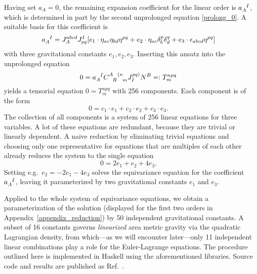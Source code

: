 \begin{example}
  Having set $a_A = 0$, the remaining expansion coefficient for the linear order is $a_A^{\hphantom AI}$, which is determined in part by the second unprolonged equation \eqref{prolong_0}. A suitable basis for this coefficient is
  \begin{equation}
    a_A^{\hphantom AI} = J_A^{abcd} J_{pq}^I\lbrack e_1 \cdot \eta_{ac} \eta_{bd} \eta^{pq} + e_2 \cdot \eta_{ac} \delta_b^p \delta_d^q + e_3 \cdot \epsilon_{abcd} \eta^{pq} \rbrack
  \end{equation}
  with three gravitational constants $e_1,e_2,e_3$. Inserting this ansatz into the unprolonged equation
  \begin{equation}
    0 = a_A^{\hphantom AI} \gmc{A}{B}{(n}{m} J^{pq)}_I N^B =\vcentcolon T^{npq}_m
  \end{equation}
  yields a tensorial equation $0 = T^{npq}_m$ with 256 components. Each component is of the form
  \begin{equation}
    0 = c_1\cdot e_1  + c_2\cdot e_2 + c_3\cdot e_3.
  \end{equation}
  The collection of all components is a system of 256 linear equations for three variables. A lot of these equations are redundant, because they are trivial or linearly dependent. A naive reduction by eliminating trivial equations and choosing only one representative for equations that are multiples of each other already reduces the system to the single equation
  \begin{equation}
    0 = 2 e_1 + e_2 + 4 e_3.
  \end{equation}
  Setting e.g.~$e_2 = -2 e_1 -4 e_3$ solves the equivariance equation for the coefficient $a_A^{\hphantom AI}$, leaving it parameterized by two gravitational constants $e_1$ and $e_3$.
\end{example}

Applied to the whole system of equivariance equations, we obtain a parameterization of the solution (displayed for the first two orders in Appendix~\ref{appendix_reduction}) by 50 independent gravitational constants. A subset of 16 constants governs \emph{linearized} area metric gravity via the quadratic Lagrangian density, from which---as we will encounter later---only 11 independent linear combinations play a role for the Euler-Lagrange equations. The procedure outlined here is implemented in Haskell using the aforementioned libraries. Source code and results are published as Ref.\ \cite{Alex_2020_area-metric-gravity}.


